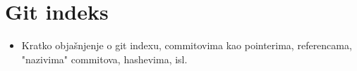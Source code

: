\chapter*{Git indeks}

\begin{itemize}
   \item Kratko objašnjenje o git indexu, commitovima kao pointerima, referencama, "nazivima" commitova, hashevima, isl.
\end{itemize}


